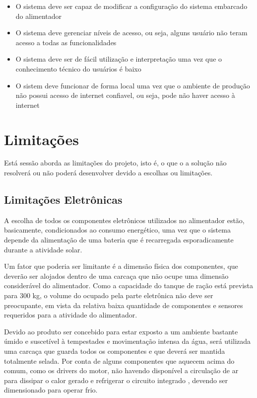 \begin{itemize}
  \item O sistema deve ser capaz de modificar a configuração do sistema embarcado do alimentador
  \item O sistema deve gerenciar níveis de acesso, ou seja, alguns usuário não teram acesso a todas as funcionalidades
  \item O sistema deve ser de fácil utilização e interpretação uma vez que o conhecimento técnico do usuários é baixo
  \item O sistem deve funcionar de forma local uma vez que o ambiente de produção não possui acesso de internet confiavel, ou seja, pode não haver acesso à internet
\end{itemize}

\section{Limitações}
Está sessão aborda as limitações do projeto, isto é, o que o a solução não resolverá ou não poderá desenvolver
devido a escolhas ou limitações.

\subsection{Limitações Eletrônicas}
A escolha de todos os componentes eletrônicos utilizados no alimentador estão, basicamente, condicionados ao consumo energético, uma vez que o sistema depende da alimentação de uma bateria que é recarregada esporadicamente durante a atividade solar.

Um fator que poderia ser limitante é a dimensão física dos componentes, que deverão ser alojados dentro de uma carcaça que não ocupe uma dimensão considerável do alimentador. Como a capacidade do tanque de ração está prevista para 300 kg, o volume do ocupado pela parte eletrônica não deve ser preocupante, em vista da relativa baixa quantidade de componentes e sensores requeridos para a atividade do alimentador.

Devido ao produto ser concebido para estar exposto a um ambiente bastante úmido e suscetível à tempestades e movimentação intensa da água, será utilizada uma carcaça que guarda todos os componentes e que deverá ser mantida totalmente selada. Por conta de alguns componentes que aquecem acima do comum, como os drivers do motor, não havendo disponível a circulação de ar para dissipar o calor gerado e refrigerar o circuito integrado , devendo ser dimensionado para operar frio.

